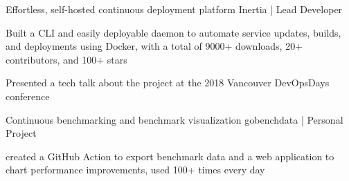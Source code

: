  {\scshape{}}
\begin{cventries}

  \cventry
    {Effortless, self-hosted continuous deployment platform} %
    {Inertia | Lead Developer} %
    {} %
    {} %
    {
      \begin{cvitems} %
        \item {Built a CLI and easily deployable daemon to automate service updates, builds, and deployments using Docker, with a total of 9000+ downloads, 20+ contributors, and 100+ stars}
        \item {Presented a tech talk about the project at the 2018 Vancouver DevOpsDays conference}
      \end{cvitems}
    }
  \cventry
    {Continuous benchmarking and benchmark visualization} %
    {gobenchdata | Personal Project} %
    {} %
    {} %
    {
      \begin{cvitems} %
        \item {created a GitHub Action to export benchmark data and a web application to chart performance improvements, used 100+ times every day}
      \end{cvitems}
    }

\end{cventries}
